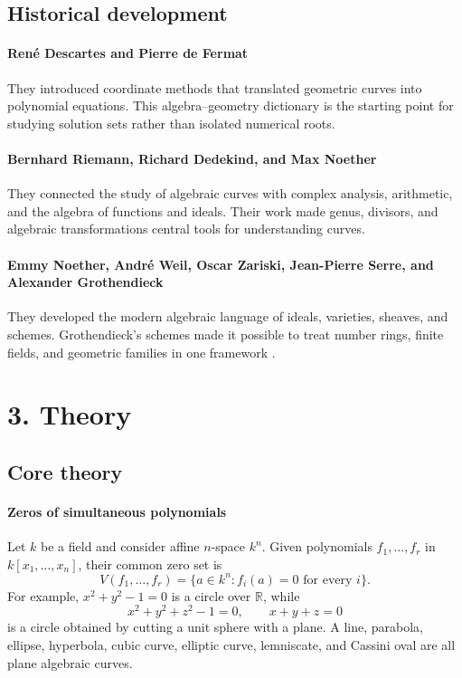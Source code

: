 \subsection*{Historical development}
\begin{historylist}
\paragraph{René Descartes and Pierre de Fermat}
They introduced coordinate methods that translated geometric curves into polynomial equations. This algebra--geometry dictionary is the starting point for studying solution sets rather than isolated numerical roots.

\paragraph{Bernhard Riemann, Richard Dedekind, and Max Noether}
They connected the study of algebraic curves with complex analysis, arithmetic, and the algebra of functions and ideals. Their work made genus, divisors, and algebraic transformations central tools for understanding curves.

\paragraph{Emmy Noether, André Weil, Oscar Zariski, Jean-Pierre Serre, and Alexander Grothendieck}
They developed the modern algebraic language of ideals, varieties, sheaves, and schemes. Grothendieck's schemes made it possible to treat number rings, finite fields, and geometric families in one framework \cite{algebraic_geometry_ref1,algebraic_geometry_ref4}.

\end{historylist}
\section*{3. Theory}
\subsection*{Core theory}
\paragraph{Zeros of simultaneous polynomials}

Let $k$ be a field and consider affine $n$-space $k^n$. Given polynomials $f_1,\ldots,f_r$ in $k[x_1,\ldots,x_n]$, their common zero set is
\[
 V(f_1,\ldots,f_r)=\{a\in k^n:f_i(a)=0\text{ for every }i\}.
\]
For example, $x^2+y^2-1=0$ is a circle over $\mathbb R$, while
\[
 x^2+y^2+z^2-1=0,\qquad x+y+z=0
\]
is a circle obtained by cutting a unit sphere with a plane. A line, parabola, ellipse, hyperbola, cubic curve, elliptic curve, lemniscate, and Cassini oval are all plane algebraic curves.

